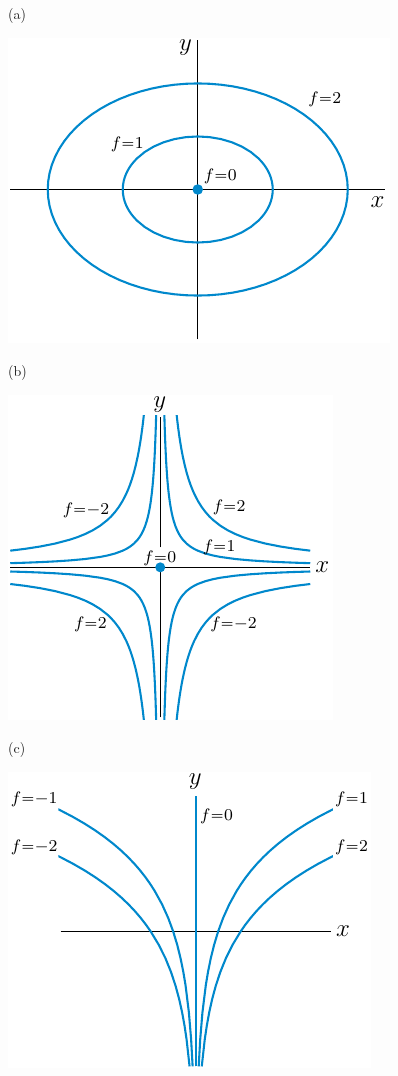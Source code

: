 \begin{answer}
(a)
\begin{center}
     \includegraphics{fig/levelEllipse.pdf}
\end{center}

(b)
\begin{center}
     \includegraphics{fig/levelHyperbola.pdf}
\end{center}

(c)
\begin{center}
     \includegraphics{fig/levelLog.pdf}
\end{center}

\end{answer}

